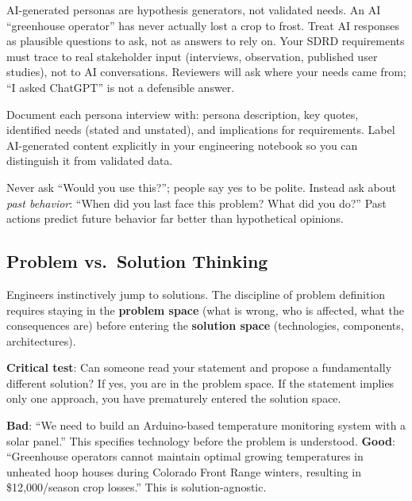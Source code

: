 \begin{warningbox}
AI-generated personas are hypothesis generators, not validated needs. An AI ``greenhouse operator'' has never actually lost a crop to frost. Treat AI responses as plausible questions to ask, not as answers to rely on. Your SDRD requirements must trace to real stakeholder input (interviews, observation, published user studies), not to AI conversations. Reviewers will ask where your needs came from; ``I asked ChatGPT'' is not a defensible answer.
\end{warningbox}

Document each persona interview with: persona description, key quotes, identified needs (stated and unstated), and implications for requirements. Label AI-generated content explicitly in your engineering notebook so you can distinguish it from validated data.

\begin{tipbox}
Never ask ``Would you use this?''; people say yes to be polite. Instead ask about \emph{past behavior}: ``When did you last face this problem? What did you do?'' Past actions predict future behavior far better than hypothetical opinions.
\end{tipbox}


\subsection{Problem vs.\ Solution Thinking}
Engineers instinctively jump to solutions. The discipline of problem definition requires staying in the \textbf{problem space} (what is wrong, who is affected, what the consequences are) before entering the \textbf{solution space} (technologies, components, architectures).

\textbf{Critical test}: Can someone read your statement and propose a fundamentally different solution? If yes, you are in the problem space. If the statement implies only one approach, you have prematurely entered the solution space.

\begin{warningbox}
\textbf{Bad}: ``We need to build an Arduino-based temperature monitoring system with a solar panel.'' This specifies technology before the problem is understood. \textbf{Good}: ``Greenhouse operators cannot maintain optimal growing temperatures in unheated hoop houses during Colorado Front Range winters, resulting in \$12,000/season crop losses.'' This is solution-agnostic.
\end{warningbox}

